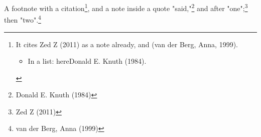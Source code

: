 \documentclass[11pt]{article}
\date{\today}
\title{}
\begin{document}
\tableofcontents

A footnote with a citation\footnote{It cites Zed Z (2011) as a note already, and (van der Berg, Anna, 1999).
\begin{itemize}
\item In a list: hereDonald E. Knuth (1984).
\end{itemize}}, and a note inside a quote "said,"\footnote{Donald E. Knuth (1984)}
and after "one";\footnote{Zed Z (2011)} then "two".\footnote{van der Berg, Anna (1999)}
\end{document}

